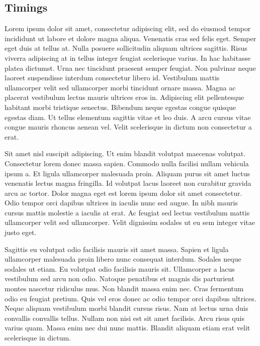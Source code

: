 \documentclass[12pt]{article}
\begin{document}
\subsection{Timings}
Lorem ipsum dolor sit amet, consectetur adipiscing elit, sed do eiusmod tempor incididunt ut labore et dolore magna aliqua. Venenatis cras sed felis eget. Semper eget duis at tellus at. Nulla posuere sollicitudin aliquam ultrices sagittis. Risus viverra adipiscing at in tellus integer feugiat scelerisque varius. In hac habitasse platea dictumst. Urna nec tincidunt praesent semper feugiat. Non pulvinar neque laoreet suspendisse interdum consectetur libero id. Vestibulum mattis ullamcorper velit sed ullamcorper morbi tincidunt ornare massa. Magna ac placerat vestibulum lectus mauris ultrices eros in. Adipiscing elit pellentesque habitant morbi tristique senectus. Bibendum neque egestas congue quisque egestas diam. Ut tellus elementum sagittis vitae et leo duis. A arcu cursus vitae congue mauris rhoncus aenean vel. Velit scelerisque in dictum non consectetur a erat.\par
Sit amet nisl suscipit adipiscing. Ut enim blandit volutpat maecenas volutpat. Consectetur lorem donec massa sapien. Commodo nulla facilisi nullam vehicula ipsum a. Et ligula ullamcorper malesuada proin. Aliquam purus sit amet luctus venenatis lectus magna fringilla. Id volutpat lacus laoreet non curabitur gravida arcu ac tortor. Dolor magna eget est lorem ipsum dolor sit amet consectetur. Odio tempor orci dapibus ultrices in iaculis nunc sed augue. In nibh mauris cursus mattis molestie a iaculis at erat. Ac feugiat sed lectus vestibulum mattis ullamcorper velit sed ullamcorper. Velit dignissim sodales ut eu sem integer vitae justo eget.\par
Sagittis eu volutpat odio facilisis mauris sit amet massa. Sapien et ligula ullamcorper malesuada proin libero nunc consequat interdum. Sodales neque sodales ut etiam. Eu volutpat odio facilisis mauris sit. Ullamcorper a lacus vestibulum sed arcu non odio. Natoque penatibus et magnis dis parturient montes nascetur ridiculus mus. Non blandit massa enim nec. Cras fermentum odio eu feugiat pretium. Quis vel eros donec ac odio tempor orci dapibus ultrices. Neque aliquam vestibulum morbi blandit cursus risus. Nam at lectus urna duis convallis convallis tellus. Nullam non nisi est sit amet facilisis. Arcu risus quis varius quam. Massa enim nec dui nunc mattis. Blandit aliquam etiam erat velit scelerisque in dictum.\par
\end{document}
